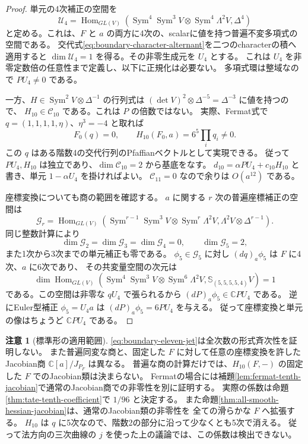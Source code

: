 \documentclass[a4paper,11pt]{ltjsarticle}
\theoremstyle{definition}
\newtheorem{remark}[theorem]{注意}
\newcommand{\CC}{\mathbb C}
\newcommand{\Sym}{\operatorname{Sym}}
\newcommand{\Hom}{\operatorname{Hom}}
\begin{document}
\begin{proof}
単元の4次補正の空間を
\[
 \mathcal U_4=
 \Hom_{GL(V)}\left(
 \Sym^4\Sym^3V\otimes\Sym^4\Lambda^2V,\Delta^4\right)
\]
と定める。これは、$F$ と $a$ の両方に4次の、scalarに値を持つ普遍不変多項式の空間である。
交代式\eqref{eq:boundary-character-alternant}を二つのcharacterの積へ適用すると
$\dim\mathcal U_4=1$ を得る。その非零生成元を $U_4$ とする。
これは $U_4$ を非零定数倍の任意性まで定義し、以下に正規化は必要ない。
多項式環は整域なので $P U_4\ne0$ である。

一方、$H\in\Sym^2V\otimes\Delta^{-1}$ の行列式は
$(\det V)^2\otimes\Delta^{-5}=\Delta^{-3}$ に値を持つので、
$H_{10}\in\mathcal C_{10}$ である。これは $P$ の倍数ではない。
実際、Fermat式で $q=(1,1,1,1,\eta)$、$\eta^3=-4$ と取れば
\[
                 F_0(q)=0,\qquad
                 H_{10}(F_0,a)=6^5\prod_iq_i\ne0.
\]
この $q$ はある階数4の交代行列のPfaffianベクトルとして実現できる。
従って $P U_4,H_{10}$ は独立であり、$\dim\mathcal C_{10}=2$ から基底をなす。
$d_{10}=\alpha P U_4+c_{10}H_{10}$ と書き、単元 $1-\alpha U_4$ を掛ければよい。
$\mathcal C_{11}=0$ なので余りは $O(a^{12})$ である。

座標変換についても商の範囲を確認する。
$a$ に関する $r$ 次の普遍座標補正の空間は
\[
 \mathcal G_r=
 \Hom_{GL(V)}\left(
 \Sym^{r-1}\Sym^3V\otimes\Sym^r\Lambda^2V,
 \Lambda^2V\otimes\Delta^{r-1}\right).
\]
同じ整数計算により
\[
 \dim\mathcal G_2=\dim\mathcal G_3=\dim\mathcal G_4=0,
 \qquad \dim\mathcal G_5=2,
\]
また1次から3次までの単元補正も零である。
$\phi_5\in\mathcal G_5$ に対し $(dq)_a\phi_5$ は $F$ に4次、$a$ に6次であり、
その共変量空間の次元は
\[
 \dim\Hom_{GL(V)}\left(
 \Sym^4\Sym^3V\otimes\Sym^6\Lambda^2V,
 \mathbb S_{(5,5,5,5,4)}V\right)=1
\]
である。この空間は非零な $qU_4$ で張られるから
$(dP)_a\phi_5\in\CC P U_4$ である。
逆にEuler型補正 $\phi_5=U_4a$ は $(dP)_a\phi_5=6P U_4$ を与える。
従って座標変換と単元の像はちょうど $\CC P U_4$ である。
\end{proof}

\begin{remark}[標準形の適用範囲]\label{rem:boundary-jet-scope}
\eqref{eq:boundary-eleven-jet}は全次数の形式斉次性を証明しない。
また普遍同変な商と、固定した $F$ に対して任意の座標変換を許した
Jacobian商 $\CC[a]/J_{P_F}$ は異なる。
普遍な商の計算だけでは、$H_{10}(F,-)$ の固定した $F$ でのJacobian類は決まらない。
Fermatの場合には補題\ref{lem:fermat-tenth-jacobian}で通常のJacobian商での非零性を別に証明する。
実際の係数は命題\ref{thm:tate-tenth-coefficient}で $1/96$ と決定する。
また命題\ref{thm:all-smooth-hessian-jacobian}は、通常のJacobian類の非零性を
全ての滑らかな $F$ へ拡張する。
$H_{10}$ は $q$ に5次なので、階数2の部分に沿って少なくとも5次で消える。
従って法方向の三次曲線の $j$ を使った上の議論では、この係数は検出できない。
\end{remark}
\end{document}
